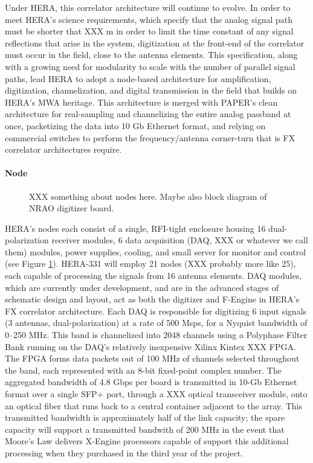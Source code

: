 \documentclass[preprint]{aastex}
\begin{document}
Under HERA, this correlator architecture will continue to evolve.  In order to meet HERA's science requirements,
which specify that the analog signal path must be shorter that XXX m in order to limit the time constant of any signal reflections
that arise in the system, digitization at the front-end of the correlator must occur in the field, close to the antenna
elements.  This specification, along with a growing need for modularity to scale with the number of parallel signal paths,
lead HERA to adopt a node-based architecture for amplification, digitization, channelization, and digital
transmission in the field that builds on HERA's MWA heritage.  This architecture is merged with PAPER's clean 
architecture for real-sampling and channelizing the entire analog passband at once, packetizing the data into
10 Gb Ethernet format, and relying on commercial switches to perform the frequency/antenna corner-turn that is
FX correlator architectures require. 

\paragraph{Node}

\begin{figure}[!ht]\centering
\caption{
XXX something about nodes here.  Maybe also block diagram of NRAO digitizer board.
}\label{fig:node_arch}
\end{figure}

HERA's nodes each consist of a single, RFI-tight enclosure housing 16 dual-polarization receiver modules, 
6 data acquisition (DAQ, XXX or whatever we call them)
modules, power supplies, cooling, and small server for monitor and control (see Figure \ref{fig:node_arch}).  HERA-331 will employ
21 nodes (XXX probably more like 25), each capable of processing the signals from 16 antenna elements.
DAQ modules, which are currently under development, and are in the advanced stages of schematic design and layout,
act as both the digitizer and F-Engine in HERA's FX correlator architecture.  Each DAQ
is responsible for digitizing 6 input signals (3 antennas, dual-polarization) at a rate
of 500 Msps, for a Nyquist bandwidth of 0--250 MHz.  This band is channelized into 2048 channels
using a Polyphase Filter Bank running on the DAQ's relatively inexpensive Xilinx Kintex XXX FPGA.
The FPGA forms data packets out of 100 MHz of channels selected throughout the band, each represented
with an 8-bit fixed-point complex number.  The aggregated bandwidth of 4.8 Gbps per board is transmitted in
10-Gb Ethernet format over a single SFP+ port, through a XXX optical transceiver module, onto an optical
fiber that runs back to a central container adjacent to the array.  
This transmitted bandwidth is approximately
half of the link capacity; the spare capacity will support a transmitted bandwith
of 200 MHz in the event that Moore's Law delivers X-Engine processors capable of support
this additional processing when they purchased in the third year of the project.
\end{document}
